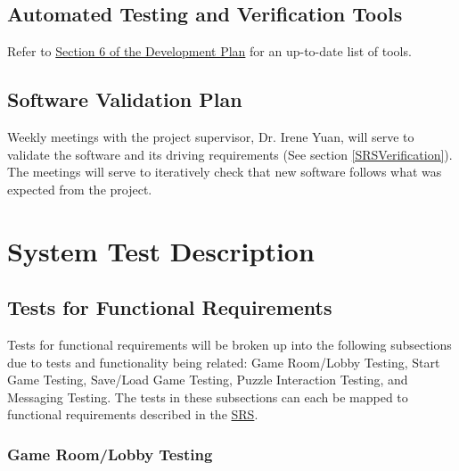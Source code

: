 \documentclass[12pt, titlepage]{article}
\begin{document}
\subsection{Automated Testing and Verification Tools}

Refer to \href{https://github.com/SammyG7/Mac-AR/blob/main/docs/DevelopmentPlan/DevelopmentPlan.pdf}{Section 6 of the Development Plan} for an up-to-date list of tools.

\subsection{Software Validation Plan}

Weekly meetings with the project supervisor, Dr. Irene Yuan, will serve to validate the software and its driving requirements (See section \ref{SRSVerification}). The meetings will serve to iteratively check that new software follows what was expected from the project.

\section{System Test Description}
	
\subsection{Tests for Functional Requirements}


Tests for functional requirements will be broken up into the following subsections due to tests and functionality being related: Game Room/Lobby Testing, Start Game Testing, Save/Load Game Testing, Puzzle Interaction Testing, and Messaging Testing. The tests in these subsections can each be mapped to functional requirements described in the \href{https://github.com/SammyG7/Mac-AR/blob/main/docs/SRS/SRS.pdf}{SRS}.
\subsubsection{Game Room/Lobby Testing}

		
\end{document}

